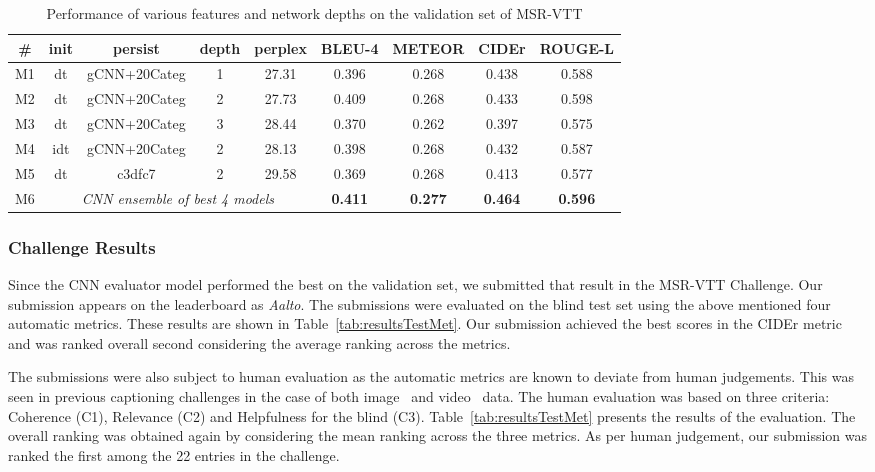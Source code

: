 \begin{table}[thp]
  \centering
  \begin{adjustbox}{center}
  \newcommand{\bs}{\small\bf}
  \begin{tabular}{||c|c|c|c|c|c|c|c|c|}
    \hline\hline
    \bf\# &\bf init &\bf persist &\bf depth &\bf perplex &\bs BLEU-4 &\bs METEOR &\bs CIDEr &\bs ROUGE-L \\\hline\hline
    M1 & dt  & gCNN+20Categ & 1  & 27.31 & 0.396 & 0.268 & 0.438 & 0.588 \\
    M2 & dt  & gCNN+20Categ & 2  & 27.73 & 0.409 & 0.268 & 0.433 & 0.598 \\
    M3 & dt  & gCNN+20Categ & 3  & 28.44 & 0.370 & 0.262 & 0.397 & 0.575 \\\hline
    M4 & idt & gCNN+20Categ & 2  & 28.13 & 0.398 & 0.268 & 0.432 & 0.587 \\
    M5 & dt  & c3dfc7       & 2  & 29.58 & 0.369 & 0.268 & 0.413 & 0.577 \\\hline
    M6 & \multicolumn{4}{c|}{\em CNN ensemble of best 4 models}
                                  & \bf0.411 & \bf0.277 & \bf0.464 & \bf0.596 \\\hline
    \hline
  \end{tabular}
  \end{adjustbox}
  \label{tab:resVttFeat}
  \caption{Performance of various features and 
    network depths on the validation set of MSR-VTT}
\end{table}


\subsubsection{Challenge Results}

Since the CNN evaluator model performed the best on the validation set, we
submitted that result in the MSR-VTT Challenge.
Our submission appears on the leaderboard as \emph{Aalto}.
The submissions were evaluated on the blind test set using the above mentioned
four automatic metrics.
These results are shown in Table~\ref{tab:resultsTestMet}.
Our submission achieved the best scores in the CIDEr metric and was ranked
overall second considering the average ranking across the metrics.

The submissions were also subject to human evaluation as the automatic metrics
are known to deviate from human judgements.
This was seen in previous captioning challenges in the case of both
image~\cite{CocoChallengeSlides} and
video~\cite{DBLP:journals/corr/RohrbachTRTPLCS16} data.
The human evaluation was based on three criteria: Coherence (C1), Relevance (C2)
and Helpfulness for the blind (C3).
Table~\ref{tab:resultsTestMet} presents the results of the evaluation.
The overall ranking was obtained again by considering the mean ranking across
the three metrics.
As per human judgement, our submission was ranked the first among the 22 entries
in the challenge.

